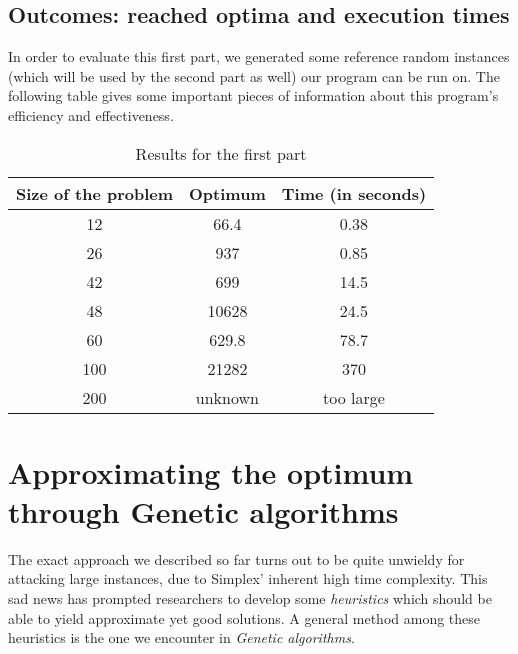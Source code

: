 \documentclass[letterpaper, 10 pt, conference]{ieeeconf}  %
\begin{document}
\subsection{Outcomes: reached optima and execution times}
In order to evaluate this first part, we generated some reference random instances (which will be used by the second part as well) our program can be run on. \newline The following table gives some important pieces of information about this program's efficiency and effectiveness.
\begin{table}[h]
\caption{Results for the first part}
\label{table_example}
\begin{center}
\begin{tabular}{|c|c|c|}
\hline
Size of the problem & Optimum & Time (in seconds) \\
\hline
12 &  66.4 &  0.38\\
\hline
26 & 937 & 0.85 \\
\hline
42 & 699 & 14.5\\
\hline
48 & 10628 & 24.5 \\
\hline
60 & 629.8 & 78.7 \\
\hline
100 & 21282 & 370 \\
\hline
200 & unknown & too large\\
\hline
\end{tabular}
\end{center}
\end{table}

\section{Approximating the optimum through Genetic algorithms}
The exact approach we described so far turns out to be quite unwieldy for attacking large instances, due to Simplex' inherent high time complexity.  
This sad news has prompted researchers to develop some \textit{heuristics} 
which should be able to yield approximate yet good solutions. A general method among these heuristics is the one we encounter in \textit{Genetic algorithms}.
\end{document}
